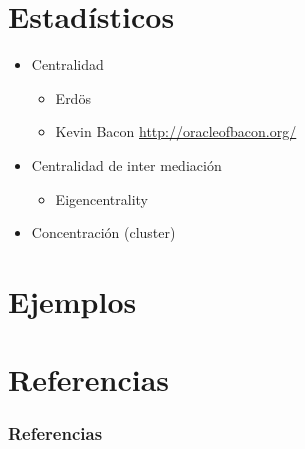 \documentclass{beamer}
\begin{document}
\section{Estad\'isticos}

\begin{frame}
\begin{itemize}
\item Centralidad
  \begin{itemize}
  \item Erdös
  \item Kevin Bacon \url{http://oracleofbacon.org/}
  \end{itemize}
\item Centralidad de inter mediaci\'on
  \begin{itemize}
  \item Eigencentrality
  \end{itemize}
\item Concentraci\'on (cluster)
\end{itemize}
\end{frame}


\begin{frame}

\end{frame}

\section{Ejemplos}

\section{Referencias}
\nocite{*}
\begin{frame}
\frametitle{Referencias}


\end{frame}
\end{document}
